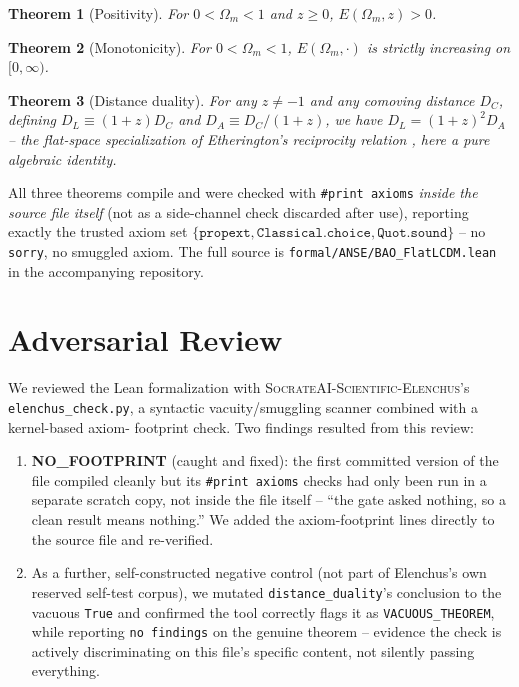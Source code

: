 \documentclass[11pt]{article}
\newtheorem{theorem}{Theorem}
\begin{document}
\begin{theorem}[Positivity]
For $0<\Omega_m<1$ and $z\ge 0$, $E(\Omega_m, z) > 0$.
\end{theorem}

\begin{theorem}[Monotonicity]
For $0<\Omega_m<1$, $E(\Omega_m, \cdot)$ is strictly increasing on
$[0,\infty)$.
\end{theorem}

\begin{theorem}[Distance duality]
For any $z\ne -1$ and any comoving distance $D_C$, defining
$D_L \equiv (1+z)D_C$ and $D_A \equiv D_C/(1+z)$, we have
$D_L = (1+z)^2 D_A$ -- the flat-space specialization of Etherington's
reciprocity relation \cite{etherington1933}, here a pure algebraic identity.
\end{theorem}

All three theorems compile and were checked with \texttt{\#print axioms}
\emph{inside the source file itself} (not as a side-channel check discarded
after use), reporting exactly the trusted axiom set
$\{\texttt{propext}, \texttt{Classical.choice}, \texttt{Quot.sound}\}$ --
no \texttt{sorry}, no smuggled axiom. The full source is
\texttt{formal/ANSE/BAO\_FlatLCDM.lean} in the accompanying repository.

\section{Adversarial Review}

We reviewed the Lean formalization with
\textsc{SocrateAI-Scientific-Elenchus}'s \texttt{elenchus\_check.py}, a
syntactic vacuity/smuggling scanner combined with a kernel-based axiom-
footprint check. Two findings resulted from this review:

\begin{enumerate}
\item \textbf{NO\_FOOTPRINT} (caught and fixed): the first committed version
of the file compiled cleanly but its \texttt{\#print axioms} checks had only
been run in a separate scratch copy, not inside the file itself --
``the gate asked nothing, so a clean result means nothing.'' We added the
axiom-footprint lines directly to the source file and re-verified.
\item As a further, self-constructed negative control (not part of
Elenchus's own reserved self-test corpus), we mutated
\texttt{distance\_duality}'s conclusion to the vacuous \texttt{True} and
confirmed the tool correctly flags it as \texttt{VACUOUS\_THEOREM}, while
reporting \texttt{no findings} on the genuine theorem -- evidence the check
is actively discriminating on this file's specific content, not silently
passing everything.
\end{enumerate}
\end{document}
